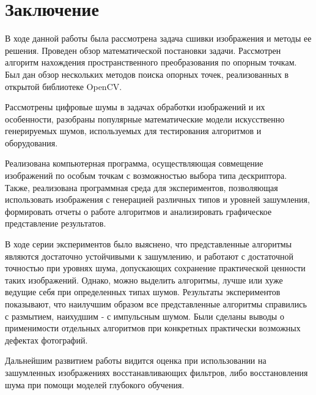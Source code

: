 \titleformat{\section}{\large\bfseries\centering}{\thesection}{0.5em}{\MakeUppercase}
\titleformat{\subsection}[block]{\bfseries\hspace{1em}}{\thesubsection}{0.5em}{}

\newpage
{}
{}
\section*{Заключение}
{
    В ходе данной работы была рассмотрена задача сшивки изображения и методы ее решения. Проведен обзор математической постановки задачи. Рассмотрен алгоритм нахождения пространственного преобразования по опорным точкам. Был дан обзор нескольких методов поиска опорных точек, реализованных в открытой библиотеке OpenCV.
    
    Рассмотрены цифровые шумы в задачах обработки изображений и их особенности, разобраны популярные математические модели искусственно генерируемых шумов, используемых для тестирования алгоритмов и оборудования. 
    
    Реализована компьютерная программа, осуществляющая совмещение изображений по особым точкам с возможностью выбора типа дескриптора. Также, реализована программная среда для экспериментов, позволяющая использовать изображения с генерацией различных типов и уровней зашумления, формировать отчеты о работе алгоритмов и анализировать графическое представление результатов. 
    
    В ходе серии экспериментов было выяснено, что представленные алгоритмы являются достаточно устойчивыми к зашумлению, и работают с достаточной точностью при уровнях шума, допускающих сохранение практической ценности таких изображений. Однако, можно выделить алгоритмы, лучше или хуже ведущие себя при определенных типах шумов. Результаты экспериментов показывают, что наилучшим образом все представленные алгоритмы справились с размытием, наихудшим - с импульсным шумом. Были сделаны выводы о применимости отдельных алгоритмов при конкретных практически возможных дефектах фотографий. 
    
    Дальнейшим развитием работы видится оценка при использовании на зашумленных изображениях восстанавливающих фильтров, либо восстановления шума при помощи моделей глубокого обучения.
}

